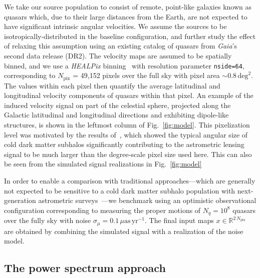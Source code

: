 \documentclass[twocolumn]{aastex631}
\newcommand{\package}[1]{\textsl{#1}\xspace}
\newcommand{\healpix}{\package{HEALPix}}
\begin{document}
We take our source population to consist of remote, point-like galaxies known as quasars which, due to their large distances from the Earth, are not expected to have significant intrinsic angular velocities. We assume the sources to be isotropically-distributed in the baseline configuration, {and further study the effect of relaxing this assumption using an existing catalog of quasars from \emph{Gaia}'s second data release (DR2)}. The velocity maps are assumed to be spatially binned, and we use  a \healpix binning~\citep{Gorski:2004by} with resolution parameter \texttt{nside=64}, corresponding to $N_\mathrm{pix}$ = 49,152 pixels over the full sky with pixel area $\sim 0.8\,\mathrm{deg}^2$. The values within each pixel then quantify the average latitudinal and longitudinal velocity components of quasars within that pixel. An example of the induced velocity signal on part of the celestial sphere, projected along the Galactic latitudinal and longitudinal directions and exhibiting dipole-like structures, is shown in the leftmost column of Fig.~\ref{fig:model}. {This pixelization level was motivated by the results of~\citet{Mishra-Sharma:2020ynk}, which showed the typical angular size of cold dark matter subhalos significantly contributing to the astrometric lensing signal to be much larger than the degree-scale pixel size used here. This can also be seen from the simulated signal realizations in Fig.~\ref{fig:model}}

In order to enable a comparison with traditional approaches---which are generally not expected to be sensitive to a cold dark matter subhalo population with next-generation astrometric surveys~\citep{VanTilburg:2018ykj,Mishra-Sharma:2020ynk}---we benchmark using an optimistic observational configuration corresponding to measuring the proper motions of $N_q = 10^8$ quasars {over the fully sky} with noise $\sigma_{\mu} = 0.1\,\mu\mathrm{as}\,\mathrm{yr}^{-1}$. {The final input maps $x\in\mathbb R^{2\,N_\mathrm{pix}}$ are obtained by combining the simulated signal with a realization of the noise model.}

\subsection{The power spectrum approach} 
\label{sec:power_spectrum}
\end{document}
